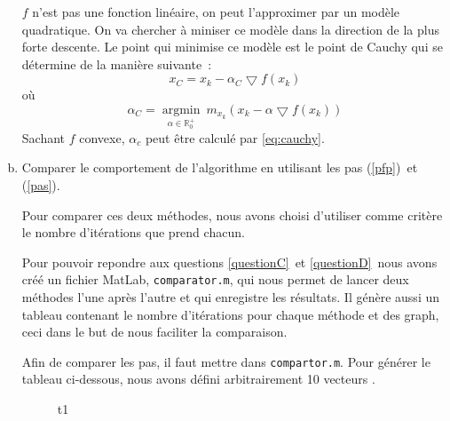 \documentclass[11pt,a4paper,twoside,onecolumn,titlepage]{report}
\begin{document}
\begin{enumerate}[(a)]
   
$f$ n'est pas une fonction linéaire, on peut l'approximer par un modèle quadratique.
On va chercher à miniser ce modèle dans la direction de la plus forte descente. Le point qui minimise ce modèle est le point de Cauchy qui se détermine de la manière suivante~:
\begin{equation}
x_C = x_k - \alpha_C \bigtriangledown f(x_k)
\end{equation}
où
\begin{equation}
\alpha_C = \underset{\alpha \in \mathbb{R}^+_0}{\operatorname{argmin}}\ m_{x_k}(x_k-\alpha\bigtriangledown f(x_k))
\end{equation}
Sachant $f$ convexe, $\alpha_c$ peut être calculé par \eqref{eq:cauchy}.




%
%
%

\item\label{questionC} Comparer le comportement de l'algorithme en utilisant les pas (\ref{pfp})\ et (\ref{pas}).

%
%
Pour comparer ces deux méthodes, nous avons choisi d'utiliser comme critère le nombre d'itérations que prend chacun. 


Pour pouvoir repondre aux questions \ref{questionC}\ et \ref{questionD}\ nous avons créé un fichier MatLab, \texttt{comparator.m}, qui nous permet de lancer deux méthodes l'une après l'autre et qui enregistre les résultats. Il génère aussi un tableau contenant le nombre d'itérations pour chaque méthode et des graph, ceci dans le but de nous faciliter la comparaison.

Afin de comparer les pas, il faut mettre  dans \texttt{compartor.m}. Pour générer le tableau ci-dessous, nous avons défini arbitrairement 10 vecteurs .

\begin{figure}
\caption{t1}\label{t1}
\end{figure}


\end{enumerate}
\end{document}
